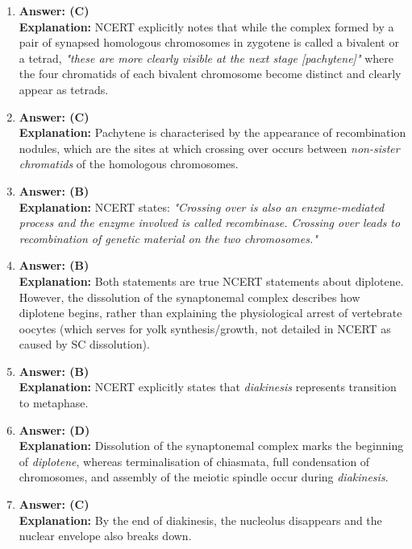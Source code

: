 \documentclass[11pt,a4paper]{article}
\begin{document}
\begin{enumerate}[label=\textbf{\arabic*.}]
\item \textbf{Answer: (C)}\\
\textbf{Explanation:} NCERT explicitly notes that while the complex formed by a pair of synapsed homologous chromosomes in zygotene is called a bivalent or a tetrad, \textit{"these are more clearly visible at the next stage [pachytene]"} where the four chromatids of each bivalent chromosome become distinct and clearly appear as tetrads.

\item \textbf{Answer: (C)}\\
\textbf{Explanation:} Pachytene is characterised by the appearance of recombination nodules, which are the sites at which crossing over occurs between \textit{non-sister chromatids} of the homologous chromosomes.

\item \textbf{Answer: (B)}\\
\textbf{Explanation:} NCERT states: \textit{"Crossing over is also an enzyme-mediated process and the enzyme involved is called recombinase. Crossing over leads to recombination of genetic material on the two chromosomes."}

\item \textbf{Answer: (B)}\\
\textbf{Explanation:} Both statements are true NCERT statements about diplotene. However, the dissolution of the synaptonemal complex describes how diplotene begins, rather than explaining the physiological arrest of vertebrate oocytes (which serves for yolk synthesis/growth, not detailed in NCERT as caused by SC dissolution).

\item \textbf{Answer: (B)}\\
\textbf{Explanation:} NCERT explicitly states that \textit{diakinesis} represents transition to metaphase.

\item \textbf{Answer: (D)}\\
\textbf{Explanation:} Dissolution of the synaptonemal complex marks the beginning of \textit{diplotene}, whereas terminalisation of chiasmata, full condensation of chromosomes, and assembly of the meiotic spindle occur during \textit{diakinesis}.

\item \textbf{Answer: (C)}\\
\textbf{Explanation:} By the end of diakinesis, the nucleolus disappears and the nuclear envelope also breaks down.


\end{enumerate}
\end{document}
